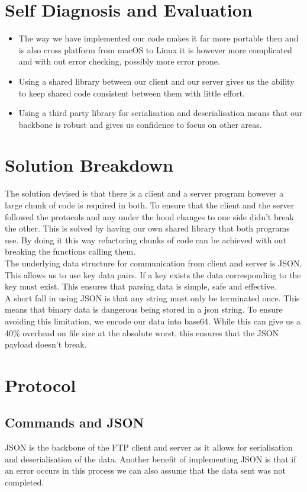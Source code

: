 \documentclass{article}
\begin{document}
\section{Self Diagnosis and Evaluation}
\begin{itemize}
\item The way we have implemented our code makes it far more portable then and is also cross platform from macOS to Linux it is however more complicated and with out error checking, possibly more error prone.
\item Using a shared library between our client and our server gives us the ability to keep shared code consistent between them with little effort.
\item Using a third party library for serialisation and deserialisation means that our backbone is robust and gives us confidence to focus on other areas.
\end{itemize}

\section{Solution Breakdown}
The solution devised is that there is a client and a server program however a large chunk of code is required in both. To ensure that the client and the server followed the protocols and any under the hood changes to one side didn't break the other. This is solved by having our own shared library that both programs use. By doing it this way refactoring chunks of code can be achieved with out breaking the functions calling them.\\

The underlying data structure for communication from client and server is JSON. This allows us to use key data pairs. If a key exists the data corresponding to the key must exist. This ensures that parsing data is simple, safe and effective.\\

A short fall in using JSON is that any string must only be terminated once. This means that binary data is dangerous being stored in a json string. To ensure avoiding this limitation, we encode our data into base64. While this can give us a 40\% overhead on file size at the absolute worst, this ensures that the JSON payload doesn't break.

\section{Protocol}
\subsection{Commands and JSON}
JSON is the backbone of the FTP client and server as it allows for serialisation and deserialisation of the data. Another benefit of implementing JSON is that if an error occurs in this process we can also assume that the data sent was not completed.
\end{document}
